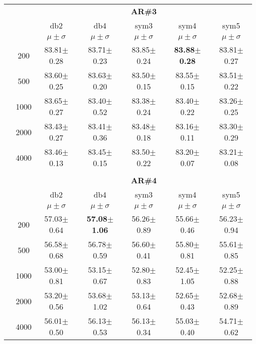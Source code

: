 \begin{table}[H]
\begin{tabular}{|c|c|c c c c c|}

\cline{3-7}
\multicolumn{2}{c|}{\multirow{3}{*}{}} & \multicolumn{5}{c|}{\textbf{AR\#3}}   \\\cline{3-7} 
\multicolumn{2}{c|}{}  & db2 & db4 & sym3 & sym4 & sym5 \\\cline{3-7}%
\multicolumn{2}{c|}{}& $\mu \pm \sigma$ & $\mu \pm \sigma$ & $\mu \pm \sigma$ & $\mu \pm \sigma$ & $\mu \pm \sigma$ \\\hline

\multicolumn{1}{|c|}{ \multirow{5}{*}{\rotatebox[origin=c]{90}{\textbf{Neurônios}}} }
& 200	&83.81$\pm$0.28	&83.71$\pm$0.23	&83.85$\pm$0.24	&\textbf{83.88$\pm$0.28}	&83.81$\pm$0.27	\\\cline{2-7}
& 500	&83.60$\pm$0.25	&83.63$\pm$0.20	&83.50$\pm$0.15	&83.55$\pm$0.15	&83.51$\pm$0.22	\\\cline{2-7}
& 1000	&83.65$\pm$0.27	&83.40$\pm$0.52	&83.38$\pm$0.24	&83.40$\pm$0.22	&83.26$\pm$0.25	\\\cline{2-7}
& 2000	&83.43$\pm$0.27	&83.41$\pm$0.36	&83.48$\pm$0.18	&83.16$\pm$0.11	&83.30$\pm$0.29	\\\cline{2-7}
& 4000	&83.46$\pm$0.13	&83.45$\pm$0.15	&83.50$\pm$0.22	&83.20$\pm$0.07	&83.21$\pm$0.08	\\ \midrule

\multicolumn{7}{c}{}\\ 



\cline{3-7}
\multicolumn{2}{c|}{\multirow{3}{*}{}} & \multicolumn{5}{c|}{\textbf{AR\#4}}   \\\cline{3-7} 
\multicolumn{2}{c|}{}  & db2 & db4 & sym3 & sym4 & sym5 \\\cline{3-7}%
\multicolumn{2}{c|}{}& $\mu \pm \sigma$ & $\mu \pm \sigma$ & $\mu \pm \sigma$ & $\mu \pm \sigma$ & $\mu \pm \sigma$ \\\hline
\multicolumn{1}{|c|}{ \multirow{5}{*}{\rotatebox[origin=c]{90}{\textbf{Neurônios}}} }
& 200	&57.03$\pm$0.64	&\textbf{57.08$\pm$1.06}	&56.26$\pm$0.89	&55.66$\pm$0.46	&56.23$\pm$0.94	\\\cline{2-7}
& 500	&56.58$\pm$0.68	&56.78$\pm$0.59	&56.60$\pm$0.41	&55.80$\pm$0.81	&55.61$\pm$0.85	\\\cline{2-7}
& 1000	&53.00$\pm$0.81	&53.15$\pm$0.67	&52.80$\pm$0.83	&52.45$\pm$1.05	&52.25$\pm$0.88	\\\cline{2-7}
& 2000	&53.20$\pm$0.56	&53.68$\pm$1.02	&53.13$\pm$0.64	&52.65$\pm$0.43	&52.68$\pm$0.89	\\\cline{2-7}
& 4000	&56.01$\pm$0.50	&56.13$\pm$0.53	&56.13$\pm$0.34	&55.03$\pm$0.40	&54.71$\pm$0.62 \\\midrule
 \end{tabular}

\end{table}



